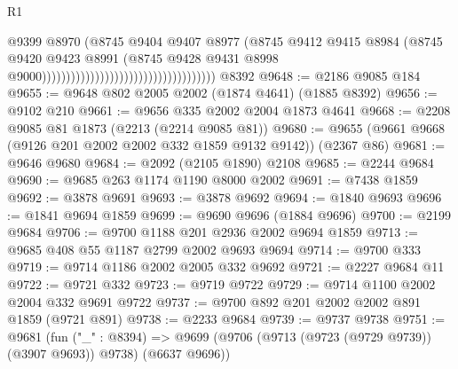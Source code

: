 \begin{lexlean}{R1}
\begin{coremodule}
                                                                    @9399
                                                                    @8970
                                                                    (@8745
                                                                      @9404
                                                                      @9407
                                                                      @8977
                                                                      (@8745
                                                                        @9412
                                                                        @9415
                                                                        @8984
                                                                        (@8745
                                                                          @9420
                                                                          @9423
                                                                          @8991
                                                                          (@8745
                                                                            @9428
                                                                            @9431
                                                                            @8998
                                                                            @9000))))))))))))))))))))))))))))))))))))
    @8392
@9648 := @2186 @9085 @184
@9655 := @9648 @802 @2005 @2002 (@1874 @4641) (@1885 @8392)
@9656 := @9102 @210
@9661 := @9656 @335 @2002 @2004 @1873 @4641
@9668 := @2208 @9085 @81 @1873 (@2213 (@2214 @9085 @81))
@9680 := @9655 (@9661 @9668 (@9126 @201 @2002 @2002 @332 @1859 @9132 @9142)) (@2367 @86)
@9681 := @9646 @9680
@9684 := @2092 (@2105 @1890) @2108
@9685 := @2244 @9684
@9690 := @9685 @263 @1174 @1190 @8000 @2002
@9691 := @7438 @1859
@9692 := @3878 @9691
@9693 := @3878 @9692
@9694 := @1840 @9693
@9696 := @1841 @9694 @1859
@9699 := @9690 @9696 (@1884 @9696)
@9700 := @2199 @9684
@9706 := @9700 @1188 @201 @2936 @2002 @9694 @1859
@9713 := @9685 @408 @55 @1187 @2799 @2002 @9693 @9694
@9714 := @9700 @333
@9719 := @9714 @1186 @2002 @2005 @332 @9692
@9721 := @2227 @9684 @11
@9722 := @9721 @332
@9723 := @9719 @9722
@9729 := @9714 @1100 @2002 @2004 @332 @9691 @9722
@9737 := @9700 @892 @201 @2002 @2002 @891 @1859 (@9721 @891)
@9738 := @2233 @9684
@9739 := @9737 @9738
@9751 := @9681
    (fun ("_" : @8394) =>
    @9699 (@9706 (@9713 (@9723 (@9729 @9739)) (@3907 @9693)) @9738) (@6637 @9696))

\end{coremodule}
\end{lexlean}
